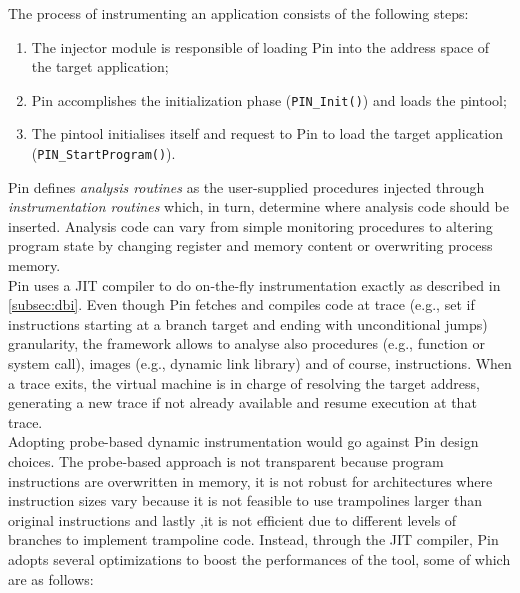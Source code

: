 \documentclass[LaM,binding=0.6cm]{sapthesis}
\begin{document}
The process of instrumenting an application consists of the following steps:
\begin{enumerate}
\item The injector module is responsible of loading Pin into the address space of the target application;
\item Pin accomplishes the initialization phase (\texttt{PIN\_Init()}) and loads the pintool;
\item The pintool initialises itself and request to Pin to load the target application (\texttt{PIN\_StartProgram()}).
\end{enumerate}
Pin defines \textit{analysis routines} as the user-supplied procedures injected through \textit{instrumentation routines} which, in turn, determine where analysis code should be inserted. Analysis code can vary from simple monitoring procedures to altering program state by changing register and memory content or overwriting process memory.\\
Pin uses a JIT compiler to do on-the-fly instrumentation exactly as described in \autoref{subsec:dbi}. Even though Pin fetches and compiles code at trace (e.g., set if instructions starting at a branch target and ending with unconditional jumps) granularity, the framework allows to analyse also procedures (e.g., function or system call), images (e.g., dynamic link library) and of course, instructions. When a trace exits, the virtual machine is in charge of resolving the target address, generating a new trace if not already available and resume execution at that trace.\\
Adopting probe-based dynamic instrumentation would go against Pin design choices. The probe-based approach is not transparent because program instructions are overwritten in memory, it is not robust for architectures where instruction sizes vary because it is not feasible to use trampolines larger than original instructions and lastly ,it is not efficient due to different levels of branches to implement trampoline code. Instead, through the JIT compiler, Pin adopts several optimizations to boost the performances of the tool, some of which are as follows:
\end{document}
